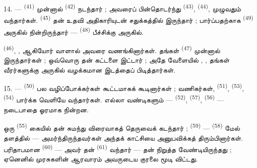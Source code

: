 \VUsaut{3.0mm}

14. ---  \textsuperscript{(41)} முன்னால்
 \textsuperscript{(42)} நடந்தார் ; அவரைப்
பின்தொடர்ந்து  \textsuperscript{(43)},
 \textsuperscript{(44)},  முழுவதும் வந்தார்கள். 
\textsuperscript{(45)} தன் உதவி அதிகாரியுடன் சதுக்கத்தில் இருந்தார் ;
 பார்ப்பதற்காக 
\textsuperscript{(49)} அருகில் நின்றிருந்தார் — 
\textsuperscript{(48)} பீச்சிக்கு அருகில்.

 \textsuperscript{(46)},
,  ஆகியோர்
வாளால் அவரை வணங்கினார்கள்.  தங்கள்
 \textsuperscript{(47)} முன்னால் இருந்தார்கள் ;
ஒவ்வொரு  தன்  கட்டளை
இட்டார் ; அதே வேளையில் ,
,  தங்கள்
வீரர்களுக்கு அருகில் வழக்கமான இடத்தைப் பிடித்தார்கள்.

15. ---  \textsuperscript{(50)} பல வழிப்போக்கர்கள்
கூட்டமாகக் கூடினார்கள் ; வணிகர்கள், 
\textsuperscript{(51)}, 
\textsuperscript{(53)},  \textsuperscript{(54)}
 பார்க்க வெளியே வந்தார்கள். எல்லா வண்டிகளும் —
 \textsuperscript{(52)}, 
\textsuperscript{(57)}, 
\textsuperscript{(56)} — நடைபாதை ஓரமாக நின்றன.

\VUsaut{3.0mm}

ஒரு  \textsuperscript{(55)} கையில் தன்
 சுமந்து விரைவாகத் தெருவைக் கடந்தார் ;
 \textsuperscript{(59)} —
 \textsuperscript{(58)} மேல் தளத்தில் —
அமர்ந்திருந்தவர்கள் அந்தக் காட்சியை அனுபவிக்கத்
திரும்பினார்கள். பரிதாபமான  \textsuperscript{(60)} —
அவர் தன்  \textsuperscript{(61)} வந்தார் —
தன்  நிறுத்த வேண்டியிருந்தது ; ஏனெனில் முரசுகளின்
ஆரவாரம் அவருடைய குரலை மூடி விட்டது.


